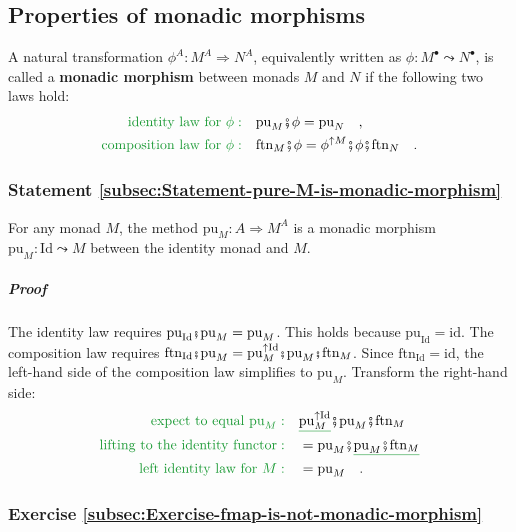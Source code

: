 \subsection{Properties of monadic morphisms}

A natural transformation $\phi^{A}:M^{A}\Rightarrow N^{A}$, equivalently
written as $\phi:M^{\bullet}\leadsto N^{\bullet}$, is called a \textbf{monadic
morphism} between monads $M$ and $N$ if
the following two laws hold:
\begin{align*}
{\color{greenunder}\text{identity law for }\phi:}\quad & \text{pu}_{M}\bef\phi=\text{pu}_{N}\quad,\\
{\color{greenunder}\text{composition law for }\phi:}\quad & \text{ftn}_{M}\bef\phi=\phi^{\uparrow M}\bef\phi\bef\text{ftn}_{N}\quad.
\end{align*}


\subsubsection{Statement \label{subsec:Statement-pure-M-is-monadic-morphism}\ref{subsec:Statement-pure-M-is-monadic-morphism}}

For any monad $M$, the method $\text{pu}_{M}:A\Rightarrow M^{A}$
is a monadic morphism $\text{pu}_{M}:\text{Id}\leadsto M$ between
the identity monad and $M$.

\subparagraph{Proof}

The identity law requires $\text{pu}_{\text{Id}}\bef\text{pu}_{M}=\text{pu}_{M}$.
This holds because $\text{pu}_{\text{Id}}=\text{id}$. The composition
law requires $\text{ftn}_{\text{Id}}\bef\text{pu}_{M}=\text{pu}_{M}^{\uparrow\text{Id}}\bef\text{pu}_{M}\bef\text{ftn}_{M}$.
Since $\text{ftn}_{\text{Id}}=\text{id}$, the left-hand side of the
composition law simplifies to $\text{pu}_{M}$. Transform the right-hand
side:
\begin{align*}
{\color{greenunder}\text{expect to equal }\text{pu}_{M}:}\quad & \gunderline{\text{pu}_{M}^{\uparrow\text{Id}}}\bef\text{pu}_{M}\bef\text{ftn}_{M}\\
{\color{greenunder}\text{lifting to the identity functor}:}\quad & =\text{pu}_{M}\bef\gunderline{\text{pu}_{M}\bef\text{ftn}_{M}}\\
{\color{greenunder}\text{left identity law for }M:}\quad & =\text{pu}_{M}\quad.
\end{align*}


\subsubsection{Exercise \label{subsec:Exercise-fmap-is-not-monadic-morphism}\ref{subsec:Exercise-fmap-is-not-monadic-morphism}}

